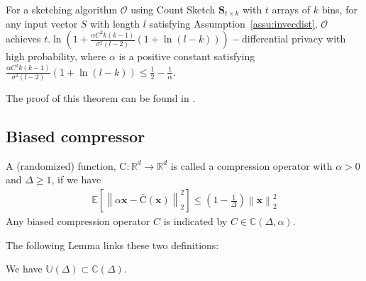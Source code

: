 
\begin{theorem}
For a sketching algorithm $\mathcal{O}$ using Count Sketch $\mathbf{S}_{t\times k}$ with $t$ arrays of $k$ bins, for any input vector $S$ with length $l$ satisfying Assumption~\ref{assu:invecdist}, $\mathcal{O}$ achieves $t.\ln \left(1+\frac{\alpha C^2 k(k-1)}{\sigma^2(l-2)}(1+\ln(l-k) )\right)-$differential privacy with high probability, where $\alpha$ is a positive constant satisfying $\frac{\alpha C^2 k(k-1)}{\sigma^2(l-2)}(1+\ln(l-k) )\leq \frac{1}{2}-\frac{1}{\alpha}$.
\end{theorem}
The proof of this theorem can be found in \cite{li2019privacy}.




\subsection{Biased compressor}
\begin{definition}
A (randomized) function,  ${\text{C}}:\mathbb{R}^{d}\rightarrow\mathbb{R}^{d}$ is called a compression operator with $\alpha>0$ and $\Delta\geq 1$, if we have 
\begin{align}
    \mathbb{E}\left[\left\|\alpha\boldsymbol{x}-\bar{\text{C}}(\boldsymbol{x})\right\|^2_2\right]\leq \left(1-\frac{1}{\Delta}\right)\left\|\boldsymbol{x}\right\|^2_2
\end{align}
Any biased compression operator $C$ is indicated by $C\in \mathbb{C}(\Delta,\alpha)$. 
\end{definition}
The following Lemma links these two definitions:
\begin{lemma}
We have $\mathbb{U}(\Delta)\subset\mathbb{C}(\Delta)$.
\end{lemma}

